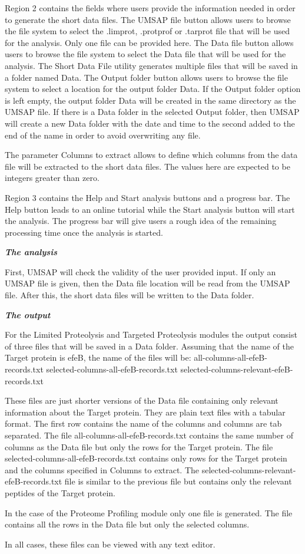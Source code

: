 Region \num{2} contains the fields where users provide the information needed in order to generate the short data files. The UMSAP file button allows users to browse the file system to select the .limprot, .protprof or .tarprot file that will be used for the analysis. Only one file can be provided here. The Data file button allows users to browse the file system to select the Data file that will be used for the analysis. The Short Data File utility generates multiple files that will be saved in a folder named Data. The Output folder button allows users to browse the file system to select a location for the output folder Data. If the Output folder option is left empty, the output folder Data will be created in the same directory as the UMSAP file. If there is a Data folder in the selected Output folder, then UMSAP will create a new Data folder with the date and time to the second added to the end of the name in order to avoid overwriting any file. 

The parameter Columns to extract allows to define which columns from the data file will be extracted to the short data files. The values here are expected to be integers greater than zero.

Region \num{3} contains the Help and Start analysis buttons and a progress bar. The Help button leads to an online tutorial while the Start analysis button will start the analysis. The progress bar will give users a rough idea of the remaining processing time once the analysis is started.

\textit{\textbf{The analysis}}

First, UMSAP will check the validity of the user provided input. If only an UMSAP file is given, then the Data file location will be read from the UMSAP file. After this, the short data files will be written to the Data folder.

\textit{\textbf{The output}}

For the Limited Proteolysis and Targeted Proteolysis modules the output consist of three files that will be saved in a Data folder. Assuming that the name of the Target protein is efeB, the name of the files will be:\newline 
all-columns-all-efeB-records.txt \newline
selected-columns-all-efeB-records.txt \newline
selected-columns-relevant-efeB-records.txt

These files are just shorter versions of the Data file containing only relevant information about the Target protein. They are plain text files with a tabular format. The first row contains the name of the columns and columns are tab separated. The file all-columns-all-efeB-records.txt contains the same number of columns as the Data file but only the rows for the Target protein. The file selected-columns-all-efeB-records.txt contains only rows for the Target protein and the columns specified in Columns to extract. The selected-columns-relevant-efeB-records.txt file is similar to the previous file but contains only the relevant peptides of the Target protein. 

In the case of the Proteome Profiling module only one file is generated. The file contains all the rows in the Data file but only the selected columns.

In all cases, these files can be viewed with any text editor.





